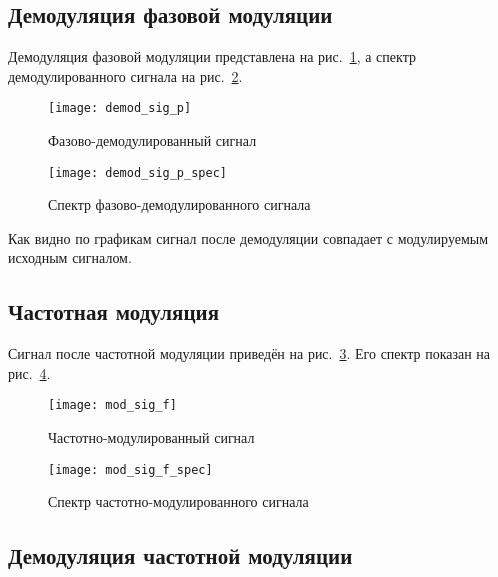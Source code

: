 \subsection{Демодуляция фазовой модуляции}
Демодуляция фазовой модуляции представлена на рис.~\ref{pic:phase_demod_sig}, а спектр демодулированного сигнала на рис.~\ref{pic:phase_demod_sig_spec}.
\begin{figure}[H]
	\begin{center}
		\texttt{[image: demod\_sig\_p]}
		\caption{Фазово-демодулированный сигнал} 
		\label{pic:phase_demod_sig} %
	\end{center}
\end{figure}
\begin{figure}[H]
	\begin{center}
		\texttt{[image: demod\_sig\_p\_spec]}
		\caption{Спектр фазово-демодулированного сигнала} 
		\label{pic:phase_demod_sig_spec} %
	\end{center}
\end{figure}
Как видно по графикам сигнал после демодуляции совпадает с модулируемым исходным сигналом.

\subsection{Частотная модуляция}

Сигнал после частотной модуляции приведён на рис.~\ref{pic:freq_mod_sig}. Его спектр показан на рис.~\ref{pic:freq_mod_sig_spec}.

\begin{figure}[H]
	\begin{center}
		\texttt{[image: mod\_sig\_f]}
		\caption{Частотно-модулированный сигнал} 
		\label{pic:freq_mod_sig} %
	\end{center}
\end{figure}

\begin{figure}[H]
	\begin{center}
		\texttt{[image: mod\_sig\_f\_spec]}
		\caption{Спектр частотно-модулированного сигнала} 
		\label{pic:freq_mod_sig_spec} %
	\end{center}
\end{figure}

\subsection{Демодуляция частотной модуляции}

